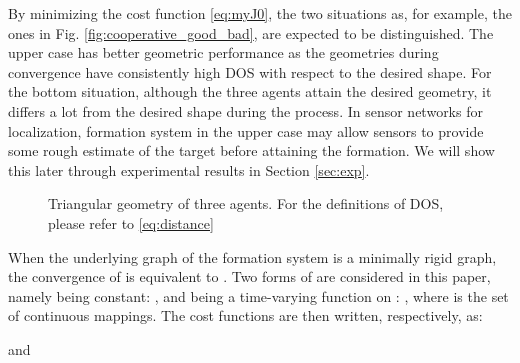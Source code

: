 \documentclass[times]{rncauth}
\begin{document}
By minimizing the cost function \eqref{eq:myJ0}, the two situations as, for example, the ones in Fig.
\ref{fig:cooperative_good_bad}, are expected to be distinguished. The upper case has better geometric
performance as the geometries during convergence have consistently high DOS
 with respect to the desired shape. For the bottom
situation, although the three agents attain the desired geometry, it
differs a lot from the desired shape during the process. In sensor
networks for localization, formation system in the upper case may
allow sensors to provide some rough estimate of the target before
attaining the formation. We will show this later through
experimental results in Section \ref{sec:exp}.
\begin{figure}
\caption{Triangular geometry of three agents. For the definitions of DOS, please refer to \eqref{eq:distance}}\label{fig:unknown}
\end{figure}

 When the
underlying graph of the formation system
 is a minimally rigid graph, the convergence of  is equivalent
to . Two forms of 
are considered in this paper, namely  being constant:
, and  being a time-varying
function on : , where  is the set of continuous mappings. The cost
functions are then written, respectively, as:

  and
\end{document}
